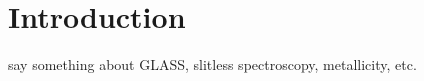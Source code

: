 
%
%

\chapter{Introduction}

say something about GLASS, slitless spectroscopy, metallicity, etc.












